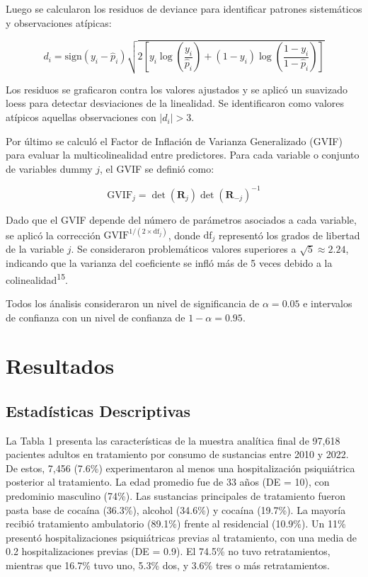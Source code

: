 \documentclass[
  spanish,
  10pt,
]{article}
\begin{document}
Luego se calcularon los residuos de deviance para identificar patrones
sistemáticos y observaciones atípicas:

\[d_i = \text{sign}(y_i - \hat{p}_i) \sqrt{2\left[y_i \log\left(\frac{y_i}{\hat{p}_i}\right) + (1-y_i)\log\left(\frac{1-y_i}{1-\hat{p}_i}\right)\right]}\]

Los residuos se graficaron contra los valores ajustados y se aplicó un
suavizado loess para detectar desviaciones de la linealidad. Se
identificaron como valores atípicos aquellas observaciones con
\(|d_i| > 3\).

Por último se calculó el Factor de Inflación de Varianza Generalizado
(GVIF) para evaluar la multicolinealidad entre predictores. Para cada
variable o conjunto de variables dummy \(j\), el GVIF se definió como:

\[\text{GVIF}_j = \det(\mathbf{R}_j)\det(\mathbf{R}_{-j})^{-1}\]

Dado que el GVIF depende del número de parámetros asociados a cada
variable, se aplicó la corrección
\(\text{GVIF}^{1/(2 \times \text{df}_j)}\), donde \(\text{df}_j\)
representó los grados de libertad de la variable \(j\). Se consideraron
problemáticos valores superiores a \(\sqrt{5} \approx 2.24\), indicando
que la varianza del coeficiente se infló más de 5 veces debido a la
colinealidad\textsuperscript{15}.

Todos los ánalisis consideraron un nivel de significancia de
\(\alpha=0.05\) e intervalos de confianza con un nivel de confianza de
\(1-\alpha=0.95\).

\newpage

\section{Resultados}\label{resultados}

\subsection{Estadísticas
Descriptivas}\label{estaduxedsticas-descriptivas}

La Tabla 1 presenta las características de la muestra analítica final de
97,618 pacientes adultos en tratamiento por consumo de sustancias entre
2010 y 2022. De estos, 7,456 (7.6\%) experimentaron al menos una
hospitalización psiquiátrica posterior al tratamiento. La edad promedio
fue de 33 años (DE = 10), con predominio masculino (74\%). Las
sustancias principales de tratamiento fueron pasta base de cocaína
(36.3\%), alcohol (34.6\%) y cocaína (19.7\%). La mayoría recibió
tratamiento ambulatorio (89.1\%) frente al residencial (10.9\%). Un 11\%
presentó hospitalizaciones psiquiátricas previas al tratamiento, con una
media de 0.2 hospitalizaciones previas (DE = 0.9). El 74.5\% no tuvo
retratamientos, mientras que 16.7\% tuvo uno, 5.3\% dos, y 3.6\% tres o
más retratamientos.
\end{document}
